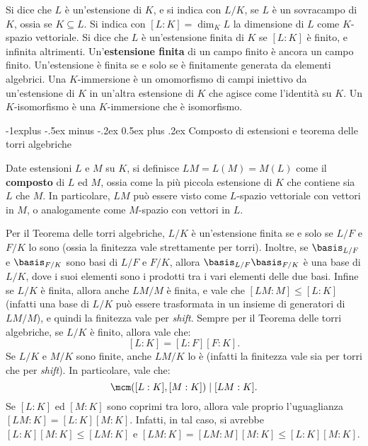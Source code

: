 \documentclass[10pt,landscape]{article}
\makeatletter
\renewcommand{\subsection}{\@startsection{subsection}{2}{0mm}%
	{-1explus -.5ex minus -.2ex}%
	{0.5ex plus .2ex}%
	{\normalfont\normalsize\bfseries}}
\makeatother
\begin{document}
\begin{multicols}{3}
		
		Si dice che $L$ è un'estensione di $K$, e si indica
		con $L / K$, se $L$ è un sovracampo di $K$,
		ossia se $K \subseteq L$. Si indica con $[L : K] = \dim_K L$ la
		dimensione di $L$ come $K$-spazio vettoriale. Si
		dice che $L$ è un'estensione finita di $K$ se $[L : K]$
		è finito, e infinita altrimenti. Un'\textbf{estensione finita}
		di un campo finito è ancora un campo finito. Un'estensione
		è finita se e solo se è finitamente generata da elementi algebrici. Una $K$-immersione è un omomorfismo di campi
		iniettivo da un'estensione di $K$ in un'altra estensione di $K$ che
		agisce come l'identità su $K$. Un $K$-isomorfismo è
		una $K$-immersione che è isomorfismo. \medskip
		
		
		\subsection{Composto di estensioni e teorema delle torri algebriche}
		
		
		Date estensioni $L$ e $M$ su $K$, si definisce
		$LM = L(M) = M(L)$ come il \textbf{composto} di $L$
		ed $M$, ossia come la più piccola estensione di $K$ che
		contiene sia $L$ che $M$. In particolare, $LM$
		può essere visto come $L$-spazio vettoriale con
		vettori in $M$, o analogamente come $M$-spazio con
		vettori in $L$. \medskip
		
		
		Per il Teorema delle torri algebriche, $L / K$ è
		un'estensione finita se e solo se $L / F$ e
		$F / K$ lo sono (ossia la finitezza vale strettamente
		per torri). Inoltre, se $\basis_{L/F}$ e $\basis_{F/K}$
		sono basi di $L/F$ e $F/K$, allora
		$\basis_{L/F} \basis_{F/K}$ è una base di
		$L / K$, dove i suoi elementi sono i prodotti tra
		i vari elementi delle due basi. Infine
		se $L / K$ è finita, allora
		anche $LM / M$ è finita, e vale che $[LM : M] \leq [L : K]$ (infatti una base di $L / K$ può essere trasformata
		in un insieme di generatori di $LM / M$), e quindi
		la finitezza vale per \textit{shift}. Sempre per
		il Teorema delle torri algebriche, se $L / K$ è
		finito, allora vale che:
		\[ [L : K] = [L : F] [F : K]. \]
		Se $L / K$ e $M / K$ sono finite, anche $LM / K$ lo
		è (infatti la finitezza vale sia per torri che per \textit{shift}). In particolare, vale che:
		\[ \mcm([L : K], [M : K]) \mid [LM : K]. \]
		Se $[L : K]$ ed $[M : K]$ sono coprimi tra loro,
		allora vale proprio l'uguaglianza
		$[LM : K] = [L : K] [M : K]$. Infatti, in tal caso,
		si avrebbe $[L : K] [M : K] \leq [LM : K]$ e
		$[LM : K] = [LM : M] [M : K] \leq [L : K] [M : K]$.
		

\end{multicols}
\end{document}
